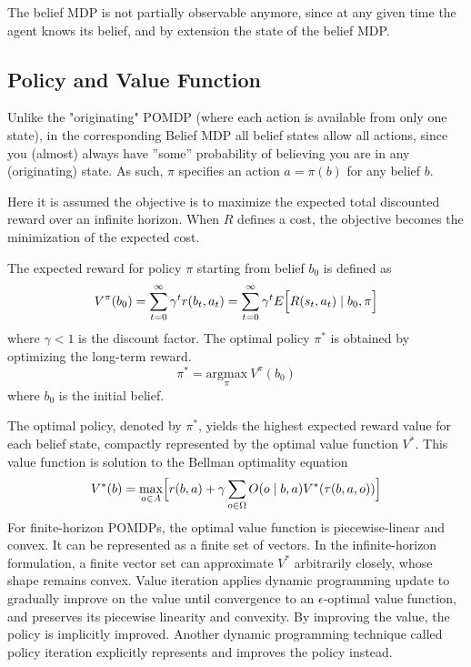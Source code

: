 \documentclass[english]{article}
\numberwithin{equation}{section}
\begin{document}
The belief MDP is not partially observable anymore, since at any given time the agent knows its belief, and by extension the state of the belief MDP.

\subsection{Policy and Value Function}
Unlike the "originating" POMDP (where each action is available from only one state), in the corresponding Belief MDP all belief states allow all actions, since you (almost) always have ''some'' probability of believing you are in any (originating) state. As such, $\pi$ specifies an action $a=\pi(b)$ for any belief $b$.

Here it is assumed the objective is to maximize the expected total discounted reward over an infinite horizon. When $R$ defines a cost, the objective becomes the minimization of the expected cost.

The expected reward for policy $\pi$ starting from belief $b_0$ is defined as
$$
V^\pi(b_0) = \sum_{t=0}^\infty  \gamma^t r(b_t, a_t) = \sum_{t=0}^\infty \gamma^t E\Bigl[ R(s_t,a_t) \mid b_0, \pi \Bigr]
$$
where $\gamma<1$ is the discount factor. The optimal policy $\pi^*$ is obtained by optimizing the long-term reward.
$$
\pi^* = \underset{\pi}{\mbox{argmax}}\ V^\pi(b_0)
$$
where $b_0$ is the initial belief.

The optimal policy, denoted by $\pi^*$, yields the highest expected reward value for each belief state, compactly represented by the optimal value function $V^*$. This value function is solution to the Bellman optimality equation
$$
V^*(b) = \max_{a\in A}\Bigl[ r(b,a) + \gamma\sum_{o\in \Omega} O(o\mid b,a) V^*(\tau(b,a,o)) \Bigr]
$$
For finite-horizon POMDPs, the optimal value function is piecewise-linear and convex. It can be represented as a finite set of vectors. In the infinite-horizon formulation, a finite vector set can approximate $V^*$ arbitrarily closely, whose shape remains convex. Value iteration applies dynamic programming update to gradually improve on the value until convergence to an $\epsilon$-optimal value function, and preserves its piecewise linearity and convexity. By improving the value, the policy is implicitly improved. Another dynamic programming technique called policy iteration explicitly represents and improves the policy instead.
\end{document}
